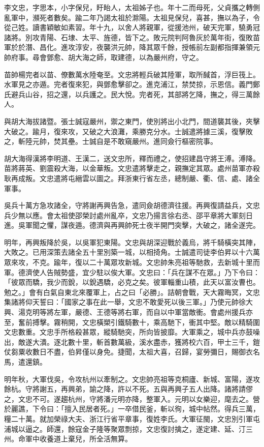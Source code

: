 
\begin{pinyinscope}
李文忠，字思本，小字保兒，盱眙人，太祖姊子也。年十二而母死，父貞攜之轉側亂軍中，瀕死者數矣。踰二年乃謁太祖於滁陽。太祖見保兒，喜甚，撫以為子，令從己姓。讀書穎敏如素習。年十九，以舍人將親軍，從援池州，破天完軍，驍勇冠諸將。別攻青陽、石埭、太平、旌德，皆下之。敗元院判阿魯灰於萬年街，復敗苗軍於於潛、昌化。進攻淳安，夜襲洪元帥，降其眾千餘，授帳前左副都指揮兼領元帥府事。尋會鄧愈、胡大海之師，取建德，以為嚴州府，守之。

苗帥楊完者以苗、僚數萬水陸奄至。文忠將輕兵破其陸軍，取所馘首，浮巨筏上。水軍見之亦遁。完者復來犯，與鄧愈擊卻之。進克浦江，禁焚掠，示恩信。義門鄭氏避兵山谷，招之還，以兵護之。民大悅。完者死，其部將乞降，撫之，得三萬餘人。

與胡大海拔諸暨。張士誠寇嚴州，禦之東門，使別將出小北門，間道襲其後，夾擊大破之。踰月，復來攻，又破之大浪灘，乘勝克分水。士誠遣將據三溪，復擊敗之，斬陸元帥，焚其壘。士誠自是不敢窺嚴州。進同僉行樞密院事。

胡大海得漢將李明道、王漢二，送文忠所，釋而禮之，使招建昌守將王溥。溥降。苗將蔣英、劉震殺大海，以金華叛。文忠遣將擊走之，親撫定其眾。處州苗軍亦殺耿再成叛。文忠遣將屯縉雲以圖之。拜浙東行省左丞，總制嚴、衢、信、處、諸全軍事。

吳兵十萬方急攻諸全，守將謝再興告急，遣同僉胡德濟往援。再興復請益兵，文忠兵少無以應。會太祖使邵榮討處州亂卒，文忠乃揚言徐右丞、邵平章將大軍刻日進。吳軍聞之懼，謀夜遁。德濟與再興帥死士夜半開門突擊，大破之，諸全遂完。

明年，再興叛降於吳，以吳軍犯東陽。文忠與胡深迎戰於義烏，將千騎橫突其陣，大敗之。已用深策去諸全五十里別築一城，以相掎角。士誠遣司徒李伯昇以十六萬眾來攻，不克。踰年，復以二十萬眾攻新城。文忠帥朱亮祖等馳救，去新城十里而軍。德濟使人告賊勢盛，宜少駐以俟大軍。文忠曰：「兵在謀不在眾。」乃下令曰：「彼眾而驕，我少而銳，以銳遇驕，必克之矣。彼軍輜重山積，此天以富汝曹也。勉之。」會有白氣自東北來覆軍上，占之曰「必勝」。詰朝會戰，天大霧晦冥，文忠集諸將仰天誓曰：「國家之事在此一舉，文忠不敢愛死以後三軍。」乃使元帥徐大興、湯克明等將左軍，嚴德、王德等將右軍，而自以中軍當敵衝。會處州援兵亦至，奮前搏擊。霧稍開，文忠橫槊引鐵騎數十，乘高馳下，衝其中堅。敵以精騎圍文忠數重。文忠手所格殺甚眾，縱騎馳突，所向皆披靡。大軍乘之，城中兵亦鼓噪出，敵遂大潰。逐北數十里，斬首數萬級，溪水盡赤，獲將校六百，甲士三千，鎧仗芻粟收數日不盡，伯昇僅以身免。捷聞，太祖大喜，召歸，宴勞彌日，賜御衣名馬，遣還鎮。

明年秋，大軍伐吳，令攻杭州以牽制之。文忠帥亮祖等克桐廬、新城、富陽，遂攻餘杭。守將謝五，再興弟，諭之降，許以不死。五與再興子五人出降。諸將請僇之，文忠不可。遂趨杭州，守將潘元明亦降，整軍入。元明以女樂迎，麾去之。營於麗譙，下令曰：「擅入民居者死。」一卒借民釜，斬以徇，城中帖然。得兵三萬，糧二十萬。就加榮祿大夫、浙江行省平章事，復姓李氏。大軍征閩，文忠別引軍屯浦城以逼之。師還，餘寇金子隆等聚眾剽掠，文忠復討擒之，遂定建、延、汀三州。命軍中收養道上棄兒，所全活無算。


\end{pinyinscope}
